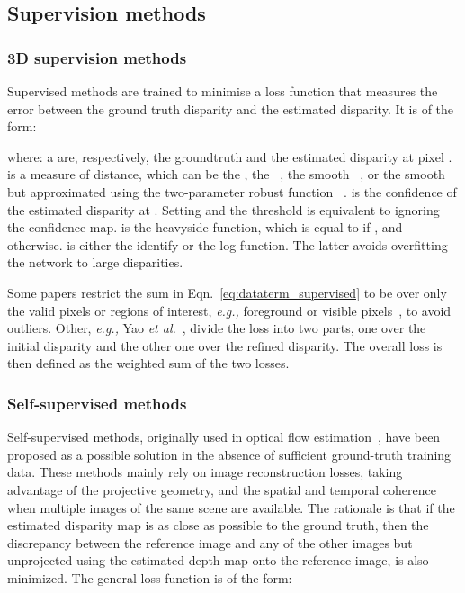 \documentclass[10pt,journal,compsoc]{IEEEtran}
\newcommand{\eg}{\emph{e.g., }}
\newcommand{\etal}{\emph{et al.}}
\newcommand{\noi}{\noindent}
\begin{document}
\subsection{Supervision methods} \label{sec:end2enddegree_supervision}

\subsubsection{3D supervision  methods}
\label{sec:3D_supervised}
Supervised methods are trained to minimise a loss function that measures the error between the ground truth disparity and the estimated disparity.  It is of the form:


\noi where:   a  are, respectively, the groundtruth and the estimated disparity at pixel .    is a measure of distance, which can be the , the  ~\cite{kendall2017end,ummenhofer2017demon,pang2017cascade,cheng2018learning},  the smooth ~\cite{chang2018pyramid}, or  the smooth  but approximated using the two-parameter robust function ~\cite{khamis2018stereonet,barron2017more}.    is the confidence of the estimated disparity at . Setting   and the threshold   is equivalent to ignoring the confidence map. 	 is the heavyside function, which is equal to  if , and  otherwise.  is either the identify  or the log function.   The latter  avoids overfitting the network to large disparities. 


	
Some papers restrict the sum in Eqn.~\eqref{eq:dataterm_supervised} to be  over only the valid pixels or regions of interest, \eg foreground or visible pixels~\cite{zhou2016learning},   to avoid outliers. Other, \eg Yao \etal~\cite{yao2018mvsnet}, divide the loss into two parts, one over the initial disparity and the other one over the refined disparity.  The overall loss is then defined as the weighted sum of the two losses. 


\subsubsection{Self-supervised methods}
\label{sec:self_supervised}
Self-supervised methods, originally used in optical flow estimation~\cite{ahmadi2016unsupervised,jason2016back},  have been proposed as a possible solution in the absence of sufficient ground-truth training data.  These methods mainly rely on image reconstruction losses, taking advantage of the projective geometry, and the spatial and temporal coherence when multiple images of the same scene are available. The rationale is that if the estimated disparity map is as close as possible to the ground truth, then the discrepancy between the reference image and any of the other images but unprojected using the estimated depth map onto the reference image, is also minimized.  The general loss function is of the form:
    	
\end{document}

